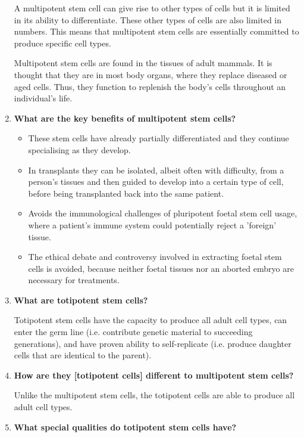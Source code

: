 \documentclass[a4paper]{article}
\begin{document}
\begin{enumerate}
A multipotent stem cell can give rise to other types of cells but it is limited in its ability to differentiate. These other types of cells are also limited in numbers. This means that multipotent stem cells are essentially committed to produce specific cell types.

Multipotent stem cells are found in the tissues of adult mammals. It is thought that they are in most body organs, where they replace diseased or aged cells. Thus, they function to replenish the body's cells throughout an individual's life.
    \item \textbf{What are the key benefits of multipotent stem cells? \cite{IanMurnaghan}}
    
\begin{itemize}
    \item These stem cells have already partially differentiated and they continue specialising as they develop.
    \item In transplants they can be isolated, albeit often with difficulty, from a person's tissues and then guided to develop into a certain type of cell, before being transplanted back into the same patient.
    \item Avoids the immunological challenges of pluripotent foetal stem cell usage, where a patient's immune system could potentially reject a 'foreign' tissue. 
    \item The ethical debate and controversy involved in extracting foetal stem cells is avoided, because neither foetal tissues nor an aborted embryo are necessary for treatments.
\end{itemize}

    \item \textbf{What are totipotent stem cells? \cite{Cheng2008}}

Totipotent stem cells have the capacity to produce all adult cell types, can enter the germ line (i.e. contribute genetic material to succeeding generations), and have proven ability to self-replicate (i.e. produce daughter cells that are identical to the parent).


    \item \textbf{How are they [totipotent cells] different to multipotent stem cells? \cite{Cheng2008}}

Unlike the multipotent stem cells, the totipotent cells are able to produce all adult cell types. 

    \item \textbf{What special qualities do totipotent stem cells have? \cite{Cheng2008}}


\end{enumerate}
\end{document}
